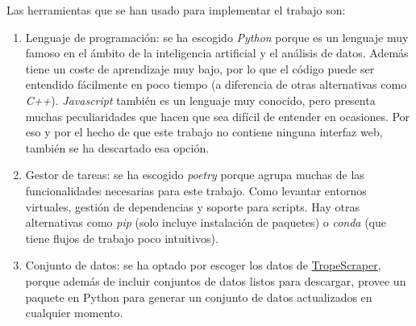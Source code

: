 Las herramientas que se han usado para implementar el trabajo son:

\begin{enumerate}
  \item Lenguaje de programación: se ha escogido \textit{Python} porque es un lenguaje muy famoso en el ámbito de la inteligencia artificial y el análisis de datos. Además
  tiene un coste de aprendizaje muy bajo, por lo que el código puede ser entendido fácilmente en poco tiempo (a diferencia de otras alternativas como \textit{C++}). \textit{Javascript}
  también es un lenguaje muy conocido, pero presenta muchas peculiaridades que hacen que sea difícil de entender en ocasiones. Por eso y por el hecho de que este trabajo no contiene ninguna
  interfaz web, también se ha descartado esa opción.
  \item Gestor de tareas: se ha escogido \textit{poetry} porque agrupa muchas de las funcionalidades necesarias para este trabajo. Como levantar entornos virtuales,
  gestión de dependencias y soporte para scripts. Hay otras alternativas como \textit{pip} (solo incluye instalación de paquetes) o \textit{conda} (que tiene flujos de trabajo poco intuitivos).
  \item Conjunto de datos: se ha optado por escoger los datos de \href{https://github.com/rhgarcia/tropescraper}{TropeScraper}, porque además de incluir conjuntos de datos listos para descargar, provee
  un paquete en Python para generar un conjunto de datos actualizados en cualquier momento.
\end{enumerate}

